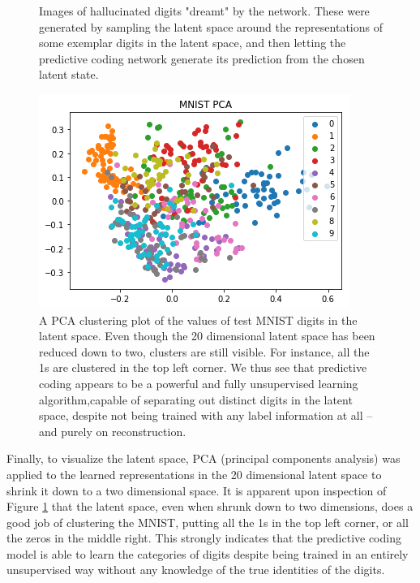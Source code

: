 \begin{figure}[htb]
\begin{subfigure}{.3\linewidth}
\end{subfigure}
\caption{Images of hallucinated digits "dreamt" by the network. These were generated by sampling the latent space around the representations of some exemplar digits in the latent space, and then letting the predictive coding network generate its prediction from the chosen latent state.}
\end{figure}

\begin{figure}[H]
\centering
\includegraphics[scale=0.6]{chapter_3_figures/mnist_pca.png}
\caption{A PCA clustering plot of the values of test MNIST digits in the latent space. Even though the 20 dimensional latent space has been reduced down to two, clusters are still visible. For instance, all the 1s are clustered in the top left corner. We thus see that predictive coding appears to be a powerful and fully unsupervised learning algorithm,capable of separating out distinct digits in the latent space, despite not being trained with any label information at all -- and purely on reconstruction.}
\label{PCA_figure}
\end{figure}

Finally, to visualize the latent space, PCA (principal components analysis) was applied to the learned representations in the 20 dimensional latent space to shrink it down to a two dimensional space. It is apparent upon inspection of Figure \ref{PCA_figure} that the latent space, even when shrunk down to two dimensions, does a good job of clustering the MNIST, putting all the 1s in the top left corner, or all the zeros in the middle right. This strongly indicates that the predictive coding model is able to learn the categories of digits despite being trained in an entirely unsupervised way without any knowledge of the true identities of the digits.

